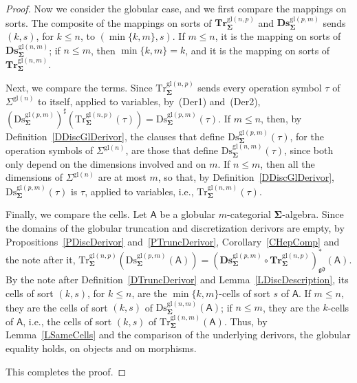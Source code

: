 \documentclass[a4paper, reqno
]{amsart}
\newcommand{\sig}[1]{\mathbf{#1}}             %
\newcommand{\calg}[1]{\boldsymbol{\mathsf{#1}}} %
\newcommand{\gd}{\mathfrak{gd}}              %
\newcommand{\gl}{\mathrm{gl}}                %
\newcommand{\Ds}{\mathrm{Ds}}
\newcommand{\Tr}{\mathrm{Tr}}
\newcommand{\bDs}{\mathbf{Ds}}
\newcommand{\bTr}{\mathbf{Tr}}
\theoremstyle{plain}
\theoremstyle{definition}
\begin{document}
\begin{proof}
Now we consider the globular case, and we first compare the mappings on sorts.
The composite of the mappings on sorts of $\bTr^{\gl(n,p)}_{\sig{\Sigma}}$ and $\bDs^{\gl(p,m)}_{\sig{\Sigma}}$ sends $(k,s)$, for $k\leq n$, to $(\min\{k,m\},s)$.
If $m\leq n$, it is the mapping on sorts of $\bDs^{\gl(n,m)}_{\sig{\Sigma}}$; if $n\leq m$, then $\min\{k,m\}=k$, and it is the mapping on sorts of $\bTr^{\gl(n,m)}_{\sig{\Sigma}}$.

Next, we compare the terms.
Since $\Tr^{\gl(n,p)}_{\sig{\Sigma}}$ sends every operation symbol $\tau$ of $\Sigma^{\gl(n)}$ to itself, applied to variables, by~(Der1) and~(Der2), $(\Ds^{\gl(p,m)}_{\sig{\Sigma}})^{\sharp}(\Tr^{\gl(n,p)}_{\sig{\Sigma}}(\tau))=\Ds^{\gl(p,m)}_{\sig{\Sigma}}(\tau)$.
If $m\leq n$, then, by Definition~\ref{DDiscGlDerivor}, the clauses that define $\Ds^{\gl(p,m)}_{\sig{\Sigma}}(\tau)$, for the operation symbols of $\Sigma^{\gl(n)}$, are those that define $\Ds^{\gl(n,m)}_{\sig{\Sigma}}(\tau)$, since both only depend on the dimensions involved and on $m$.
If $n\leq m$, then all the dimensions of $\Sigma^{\gl(n)}$ are at most $m$, so that, by Definition~\ref{DDiscGlDerivor}, $\Ds^{\gl(p,m)}_{\sig{\Sigma}}(\tau)$ is $\tau$, applied to variables, i.e., $\Tr^{\gl(n,m)}_{\sig{\Sigma}}(\tau)$.

Finally, we compare the cells.
Let $\calg{A}$ be a globular $m$-categorial $\sig{\Sigma}$-algebra.
Since the domains of the globular truncation and discretization derivors are empty, by Propositions~\ref{PDiscDerivor} and~\ref{PTruncDerivor}, Corollary~\ref{CHepComp} and the note after it, $\Tr^{\gl(n,p)}_{\sig{\Sigma}}(\Ds^{\gl(p,m)}_{\sig{\Sigma}}(\calg{A}))=(\bDs^{\gl(p,m)}_{\sig{\Sigma}}\circ\bTr^{\gl(n,p)}_{\sig{\Sigma}})^{\ast}_{\gd}(\calg{A})$.
By the note after Definition~\ref{DTruncDerivor} and Lemma~\ref{LDiscDescription}, its cells of sort $(k,s)$, for $k\leq n$, are the $\min\{k,m\}$-cells of sort $s$ of $\calg{A}$.
If $m\leq n$, they are the cells of sort $(k,s)$ of $\Ds^{\gl(n,m)}_{\sig{\Sigma}}(\calg{A})$; if $n\leq m$, they are the $k$-cells of $\calg{A}$, i.e., the cells of sort $(k,s)$ of $\Tr^{\gl(n,m)}_{\sig{\Sigma}}(\calg{A})$.
Thus, by Lemma~\ref{LSameCells} and the comparison of the underlying derivors, the globular equality holds, on objects and on morphisms.

This completes the proof.
\end{proof}
\end{document}
